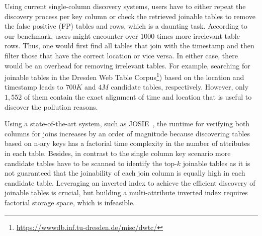 Using current single-column discovery systems, users have to either repeat the discovery process per key column or check the retrieved joinable tables to remove the false positive (FP) tables and rows, which is a daunting task.
According to our benchmark, users might encounter over $1000$ times more irrelevant table rows.
Thus, one would first find all tables that join with the timestamp and then filter those that have the correct location or vice versa.
In either case, there would be an overhead for removing irrelevant tables.
For example, searching for joinable tables in the Dresden Web Table Corpus\footnote{\url{https://wwwdb.inf.tu-dresden.de/misc/dwtc/}}) based on the location and timestamp leads to $700K$ and $4M$ candidate tables, respectively.
However, only $1,552$ of them contain the exact alignment of time and location that is useful to discover the pollution reasons.

Using a state-of-the-art system, such as JOSIE~\cite{zhu2019josie}, the runtime for verifying both columns for joins increases by an order of magnitude because discovering tables based on n-ary keys has a factorial time complexity in the number of attributes in each table. Besides, in contrast to the single column key scenario more candidate tables have to be scanned to identify the top-$k$ joinable tables as it is not guaranteed that the joinability of each join column is equally high in each candidate table. 
Leveraging an inverted index to achieve the efficient discovery of joinable tables is crucial, but building a multi-attribute inverted index requires factorial storage space, which is infeasible.

